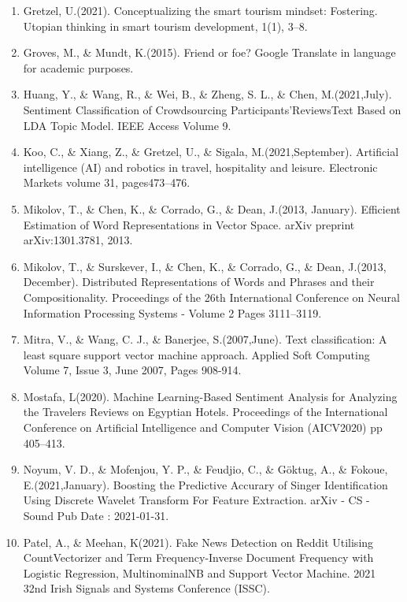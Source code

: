 \begin{enumerate}
\item Gretzel, U.(2021). Conceptualizing the smart tourism mindset: Fostering. Utopian thinking in smart tourism development, 1(1), 3–8.

\item Groves, M., \& Mundt, K.(2015). Friend or foe? Google Translate in language for academic purposes. 

\item Huang, Y., \& Wang, R., \& Wei, B., \& Zheng, S. L., \& Chen, M.(2021,July). Sentiment Classification of Crowdsourcing Participants’ReviewsText Based on LDA Topic Model. IEEE Access Volume 9.

\item Koo, C., \& Xiang, Z., \& Gretzel, U., \& Sigala, M.(2021,September). Artificial intelligence (AI) and robotics in travel, hospitality and leisure. Electronic Markets volume 31, pages473–476.

\item Mikolov, T., \& Chen, K., \& Corrado, G., \& Dean, J.(2013, January). Efficient Estimation of Word Representations in Vector Space. arXiv preprint arXiv:1301.3781, 2013.

\item Mikolov, T., \& Surskever, I., \& Chen, K., \& Corrado, G., \& Dean, J.(2013, December). Distributed Representations of Words and Phrases and their Compositionality. Proceedings of the 26th International Conference on Neural Information Processing Systems - Volume 2 Pages 3111–3119.

\newpage

\item Mitra, V., \& Wang, C. J., \& Banerjee, S.(2007,June). Text classification: A least square support vector machine approach. Applied Soft Computing Volume 7, Issue 3, June 2007, Pages 908-914.

\item Mostafa, L(2020). Machine Learning-Based Sentiment Analysis for Analyzing the Travelers Reviews on Egyptian Hotels. Proceedings of the International Conference on Artificial Intelligence and Computer Vision (AICV2020) pp 405–413.

\item Noyum, V. D., \& Mofenjou, Y. P., \& Feudjio, C., \& Göktug, A., \& Fokoue, E.(2021,January). Boosting the Predictive Accurary of Singer Identification Using Discrete Wavelet Transform For Feature Extraction. arXiv - CS - Sound Pub Date : 2021-01-31.

\item Patel, A., \& Meehan, K(2021). Fake News Detection on Reddit Utilising CountVectorizer and Term Frequency-Inverse Document Frequency with Logistic Regression, MultinominalNB and Support Vector Machine. 2021 32nd Irish Signals and Systems Conference (ISSC).


\end{enumerate}
